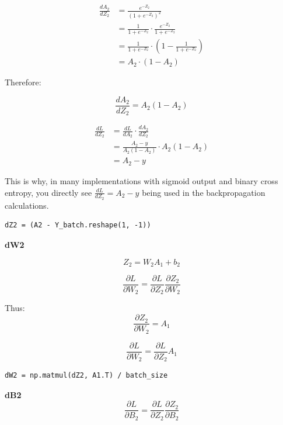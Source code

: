 \documentclass{article}
\begin{document}
\begin{align}
\frac{dA_2}{dZ_2} &= \frac{e^{-Z_2}}{(1 + {e^{-Z_2}})^2} \\
&= \frac{1}{1 + e^{-Z_2}} \cdot \frac{e^{-Z_2}}{1 + e^{-Z_2}} \\
&= \frac{1}{1 + e^{-Z_2}} \cdot \left(1 - \frac{1}{1 + e^{-Z_2}}\right) \\
&= A_2 \cdot (1 - A_2)
\end{align}

Therefore:

\begin{equation}
\frac{dA_2}{dZ_2} = A_2(1 - A_2)
\end{equation}


\begin{align}
\frac{dL}{dZ_2} &= \frac{dL}{dA_2} \cdot \frac{dA_2}{dZ_2} \\
&= \frac{A_2 - y}{A_2(1-A_2)} \cdot A_2(1-A_2) \\
&= A_2 - y
\end{align}

This is why, in many implementations with sigmoid output and binary cross entropy, you directly see $\frac{dL}{dZ_2} = A_2 - y$ being used in the backpropagation calculations.
\begin{lstlisting}
dZ2 = (A2 - Y_batch.reshape(1, -1))
\end{lstlisting}

\textbf{dW2}

\begin{equation}
Z_2 = W_2 A_1 + b_2
\end{equation}

\begin{equation}
\frac{\partial L}{\partial W_2} = \frac{\partial L}{\partial Z_2} \frac{\partial Z_2}{\partial W_2}
\end{equation}

Thus:
\begin{equation}
\frac{\partial Z_2}{\partial W_2} = A_1
\end{equation}

\begin{equation}
\frac{\partial L}{\partial W_2} = \frac{\partial L}{\partial Z_2} A_1
\end{equation}

\begin{lstlisting}
dW2 = np.matmul(dZ2, A1.T) / batch_size 
\end{lstlisting}

\textbf{dB2}
\begin{equation}
\frac{\partial L}{\partial B_2} = \frac{\partial L}{\partial Z_2} \frac{\partial Z_2}{\partial B_2}
\end{equation}
\end{document}
